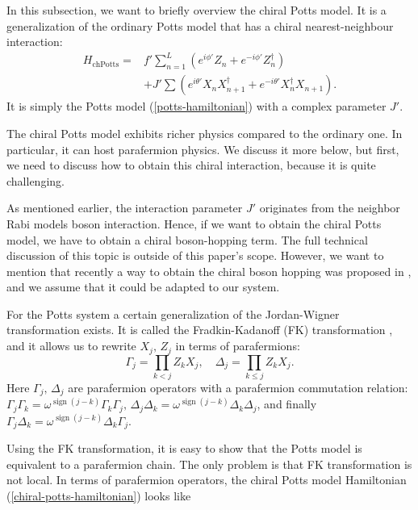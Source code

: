 \documentclass[reprint, aps, prx, amsmath, amssymb, longbibliography, superscriptaddress]{revtex4-2}
\DeclareMathOperator{\Zthree}{\mathbb{Z}_3}
\DeclareMathOperator{\sgn}{sign}
\begin{document}
In this subsection, we want to briefly overview the chiral Potts model. It is a generalization of the ordinary Potts model that has a chiral nearest-neighbour interaction:
\begin{equation}
\label{chiral-potts-hamiltonian}
\begin{aligned}
    H_{\text{chPotts}} = &f'\sum_{n=1}^L (e^{i\phi'} Z_n + e^{-i\phi'} Z_n^{\dagger}) \\
    &+ J' \sum (e^{i\theta'} X_n X_{n+1}^{\dagger} + e^{-i\theta'} X_n^{\dagger} X_{n+1}).
\end{aligned}
\end{equation}
It is simply the Potts model (\ref{potts-hamiltonian}) with a complex parameter $J'$. 

The chiral Potts model exhibits richer physics compared to the ordinary one. In particular, it can host parafermion physics. We discuss it more below, but first, we need to discuss how to obtain this chiral interaction, because it is quite challenging.

As mentioned earlier, the interaction parameter $J'$ originates from the neighbor $\Zthree$ Rabi models boson interaction. Hence, if we want to obtain the chiral Potts model, we have to obtain a chiral boson-hopping term. The full technical discussion of this topic is outside of this paper's scope. However, we want to mention that recently a way to obtain the chiral boson hopping was proposed in \cite{bermudez_synthetic_2011}, and we assume that it could be adapted to our system.

For the Potts system a certain generalization of the Jordan-Wigner transformation exists. It is called the Fradkin-Kadanoff (FK) transformation \cite{fradkin_disorder_1980}, and it allows us to rewrite $X_j, \, Z_j$ in terms of parafermions:
\begin{equation}
\Gamma_j = \prod\limits_{k<j} Z_k X_j , \quad \Delta_j = \prod\limits_{k\le j} Z_k X_j.
\end{equation}
Here $\Gamma_j, \, \Delta_j$ are parafermion operators with a parafermion commutation relation: $\Gamma_j \Gamma_k = \omega^{\sgn(j-k)} \Gamma_k \Gamma_j, \, \Delta_j \Delta_k = \omega^{\sgn(j-k)} \Delta_k \Delta_j$, and finally $\Gamma_j \Delta_k = \omega^{\sgn(j-k)} \Delta_k \Gamma_j$.

Using the FK transformation, it is easy to show that the Potts model is equivalent to a parafermion chain. The only problem is that FK transformation is not local. In terms of parafermion operators, the chiral Potts model Hamiltonian (\ref{chiral-potts-hamiltonian}) looks like 
\end{document}

